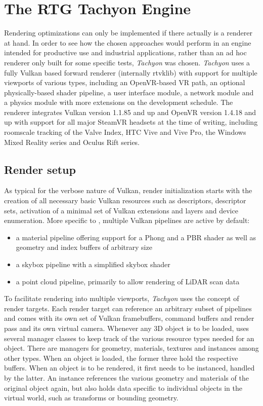 
\chapter{The \gls{RTG} \gls{Tachyon} Engine} \label{Tachyon}

Rendering optimizations can only be implemented if there actually is a renderer at hand. In order to see how the chosen approaches would perform in an engine intended for productive use and industrial applications, rather than an ad hoc renderer only built for some specific tests, \textit{\gls{Tachyon}} was chosen. \textit{\gls{Tachyon}} uses a fully Vulkan based forward renderer (internally \gls{rtvklib}) with support for multiple viewports of various types, including an \gls{OpenVR}-based \gls{VR} path, an optional physically-based shader pipeline, a user interface module, a network module and a physics module with more extensions on the development schedule. The renderer integrates Vulkan version 1.1.85 and up and \gls{OpenVR} version 1.4.18 and up with support for all major SteamVR headsets at the time of writing, including roomscale tracking of the Valve Index, HTC Vive and Vive Pro, the Windows Mixed Reality series and Oculus Rift series. 

\section{Render setup} 
As typical for the verbose nature of Vulkan, render initialization starts with the creation of all necessary basic Vulkan resources such as descriptors, descriptor sets, activation of a minimal set of Vulkan extensions and layers and device enumeration. 
More specific to , multiple Vulkan pipelines are active by default:
\begin{itemize}
\item a material pipeline offering support for a Phong and a PBR shader as well as geometry and index buffers of arbitrary size
\item a skybox pipeline with a simplified skybox shader
\item a point cloud pipeline, primarily to allow rendering of LiDAR scan data
\end{itemize}
To facilitate rendering into multiple viewports, \textit{\gls{Tachyon}} uses the concept of render targets. Each render target can reference an arbitrary subset of pipelines and comes with its own set of Vulkan framebuffers, command buffers and render pass and its own virtual camera. 
Whenever any 3D object is to be loaded,  uses several manager classes to keep track of the various resource types needed for an object. There are managers for geometry, materials, textures and instances among other types. When an object is loaded, the former three hold the respective buffers. When an object is to be rendered, it first needs to be instanced, handled by the latter. An instance references the various geometry and materials of the original object again, but also holds data specific to individual objects in the virtual world, such as transforms or bounding geometry. 

